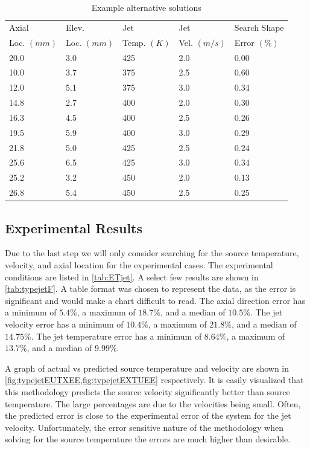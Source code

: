 \documentclass[preprint,12pt]{elsarticle}
\begin{document}
\begin{table}[!t!b!p]
\begin{center}
\begin{tabular}{ l l l l l }
\hline
Axial    		& Elev.		& Jet		  	& Jet			& Search Shape \\
Loc. $(mm)$ & Loc. $(mm)$	& Temp. $(K)$ 	& Vel. $(m/s)$	& Error $(\%)$\\ \hline
20.0 &	3.0	&	425	&	2.0	&	0.00 \\ \hline
10.0 &  3.7 &	375 &	2.5 &	0.60 \\
12.0 &	5.1 &	375	&	3.0	&	0.34 \\
14.8 &	2.7 &	400	&	2.0	&	0.30 \\
16.3 &	4.5 &	400	&	2.5	&	0.26 \\
19.5 &	5.9 &	400	&	3.0	&	0.29 \\
21.8 &	5.0 &	425	&	2.5	&	0.24 \\
25.6 &	6.5 &	425	&	3.0	&	0.34 \\
25.2 &	3.2 &	450	&	2.0	&	0.13 \\
26.8 &	5.4 &	450	&	2.5	&	0.25 \\
\hline
\end{tabular}
\caption{Example alternative solutions\cite{vanderveer}}
\label{tab:alternatives}
\end{center}
\end{table}

\subsection{Experimental Results}
Due to the last step we will only consider searching for the source temperature, velocity, and axial location for the experimental cases.  The experimental conditions are listed in \cref{tab:ETjet}.  A select few results are shown in \cref{tab:typejetF}.  A table format was chosen to represent the data, as the error is significant and would make a chart difficult to read.  The axial direction error has a minimum of $5.4\%$, a maximum of $18.7\%$, and a median of $10.5\%$.  The jet velocity error has a minimum of $10.4\%$, a maximum of $21.8\%$, and a median of $14.75\%$.  The jet temperature error has a minimum of $8.64\%$, a maximum of $13.7\%$, and a median of $9.99\%$.

A graph of actual vs predicted source temperature and velocity are shown in \cref{fig:typejetEUTXEE,fig:typejetEXTUEE} respectively.  It is easily visualized that this methodology predicts the source velocity significantly better than source temperature.  The large percentages are due to the velocities being small.  Often, the predicted error is close to the experimental error of the system for the jet velocity.  Unfortunately, the error sensitive nature of the methodology when solving for the source temperature the errors are much higher than desirable.
\end{document}
